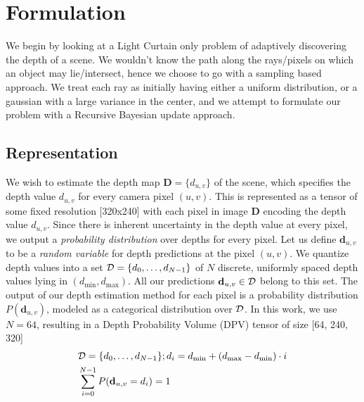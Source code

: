 
\section{Formulation}

\newcommand{\DD}{\mathbf{D}}
\newcommand{\dd}{\mathbf{d}}

We begin by looking at a Light Curtain only problem of adaptively discovering the depth of a scene. We wouldn't know the path along the rays/pixels on which an object may lie/intersect, hence we choose to go with a sampling based approach. We treat each ray as initially having either a uniform distribution, or a gaussian with a large variance in the center, and we attempt to formulate our problem with a Recursive Bayesian update approach.

\subsection{Representation}

\smallskip
We wish to estimate the depth map $\DD = \{d_{u, v}\}$ of the scene, which specifies the depth value $d_{u, v}$ for every camera pixel $(u, v)$. This is represented as a tensor of some fixed resolution [320x240] with each pixel in image $\DD$ encoding the depth value $d_{u,v}$. Since there is inherent uncertainty in the depth value at every pixel, we output a \textit{probability distribution} over depths for every pixel. Let us define $\dd_{u,v}$ to be a \textit{random variable} for depth predictions at the pixel $(u, v)$. We quantize depth values into a set $\mathcal{D} = \{d_0, \dots, d_{N-1}\}$ of $N$ discrete, uniformly spaced depth values lying in $(d_\text{min}, d_\text{max})$. All our predictions $\dd_{u, v} \in \D$ belong to this set. The output of our depth estimation method for each pixel is a probability distribution $P(\dd_{u, v})$, modeled as a categorical distribution over $\mathcal{D}$. In this work, we use $N=64$, resulting in a Depth Probability Volume (DPV) tensor of size [64, 240, 320]
\begin{align}
   &\D=\{d_0, \dots, d_{N-1}\}; d_{i}=d_\text{min}+(d_\text{max}-d_\text{min}) \cdot i 
   \label{eq:d_candi}
   \\
   &\sum_{i=0}^{N-1} P(\dd_{u,v} = d_i) =1
   \label{eq:depth_dist}
\end{align}

